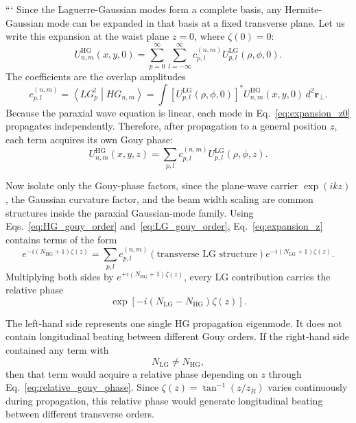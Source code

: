 \begin{resolucao}[Solution]
```
Since the Laguerre-Gaussian modes form a complete basis, any Hermite-Gaussian mode can be expanded in that basis at a fixed transverse plane. Let us write this expansion at the waist plane $z=0$, where $\zeta(0)=0$:
\begin{equation}
    U_{n,m}^{\mathrm{HG}}(x,y,0)
    =
    \sum_{p=0}^{\infty}
    \sum_{l=-\infty}^{\infty}
    c_{p,l}^{(n,m)}
    U_{p,l}^{\mathrm{LG}}(\rho,\phi,0).
    \label{eq:expansion_z0}
\end{equation}
The coefficients are the overlap amplitudes
\begin{equation}
    c_{p,l}^{(n,m)}
    =
    \left\langle
    LG_p^l
    \middle|
    HG_{n,m}
    \right\rangle
    =
    \int
    \left[
    U_{p,l}^{\mathrm{LG}}(\rho,\phi,0)
    \right]^*
    U_{n,m}^{\mathrm{HG}}(x,y,0)
    \,d^2\mathbf r_\perp.
    \label{eq:overlap_coefficients}
\end{equation}
Because the paraxial wave equation is linear, each mode in Eq.~\eqref{eq:expansion_z0} propagates independently. Therefore, after propagation to a general position $z$, each term acquires its own Gouy phase:
\begin{equation}
    U_{n,m}^{\mathrm{HG}}(x,y,z)
    =
    \sum_{p,l}
    c_{p,l}^{(n,m)}
    U_{p,l}^{\mathrm{LG}}(\rho,\phi,z).
    \label{eq:expansion_z}
\end{equation}

Now isolate only the Gouy-phase factors, since the plane-wave carrier $\exp(ikz)$, the Gaussian curvature factor, and the beam width scaling are common structures inside the paraxial Gaussian-mode family. Using Eqs.~\eqref{eq:HG_gouy_order} and~\eqref{eq:LG_gouy_order}, Eq.~\eqref{eq:expansion_z} contains terms of the form
\begin{equation}
    e^{-i(N_{\mathrm{HG}}+1)\zeta(z)}
    =
    \sum_{p,l}
    c_{p,l}^{(n,m)}
    \left(\text{transverse LG structure}\right)
    e^{-i(N_{\mathrm{LG}}+1)\zeta(z)}.
    \label{eq:gouy_phase_comparison_expansion}
\end{equation}
Multiplying both sides by $e^{+i(N_{\mathrm{HG}}+1)\zeta(z)}$, every LG contribution carries the relative phase
\begin{equation}
    \exp\left[
        -i
        (N_{\mathrm{LG}}-N_{\mathrm{HG}})
        \zeta(z)
    \right].
    \label{eq:relative_gouy_phase}
\end{equation}

The left-hand side represents one single HG propagation eigenmode. It does not contain longitudinal beating between different Gouy orders. If the right-hand side contained any term with
\[
    N_{\mathrm{LG}}\neq N_{\mathrm{HG}},
\]
then that term would acquire a relative phase depending on $z$ through Eq.~\eqref{eq:relative_gouy_phase}. Since $\zeta(z)=\tan^{-1}(z/z_R)$ varies continuously during propagation, this relative phase would generate longitudinal beating between different transverse orders.


\end{resolucao}

